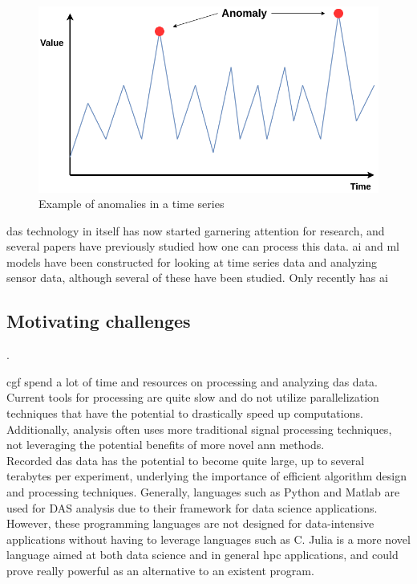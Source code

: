 \begin{figure}[!h]
    \centering
    \includegraphics[scale=0.4]{figures/anolay_line.png}
    \caption{Example of anomalies in a time series}
    \label{fig:anomaly_example}
\end{figure}

\acrshort{das} technology in itself has now started garnering attention for research, and several papers have previously studied how one can process this data. \acrshort{ai} and \acrshort{ml} models have been constructed for looking at time series data and analyzing sensor data, although several of these have been studied.  Only recently has \acrshort{ai}


\subsection{Motivating challenges}. 

\acrfull{cgf} spend a lot of time and resources on processing and analyzing \acrshort{das} data. Current tools for processing are quite slow and do not utilize parallelization techniques that have the potential to drastically speed up computations. Additionally, analysis often uses more traditional signal processing techniques, not leveraging the potential benefits of more novel \acrshort{ann} methods. \\ 


Recorded \acrshort{das} data has the potential to become quite large, up to several terabytes per experiment, underlying the importance of efficient algorithm design and processing techniques. Generally, languages such as Python and Matlab are used for DAS analysis due to their framework for data science applications. However, these programming languages are not designed for data-intensive applications without having to leverage languages such as C. Julia is a more novel language aimed at both data science and in general \acrfull{hpc} applications, and could prove really powerful as an alternative to an existent program.


